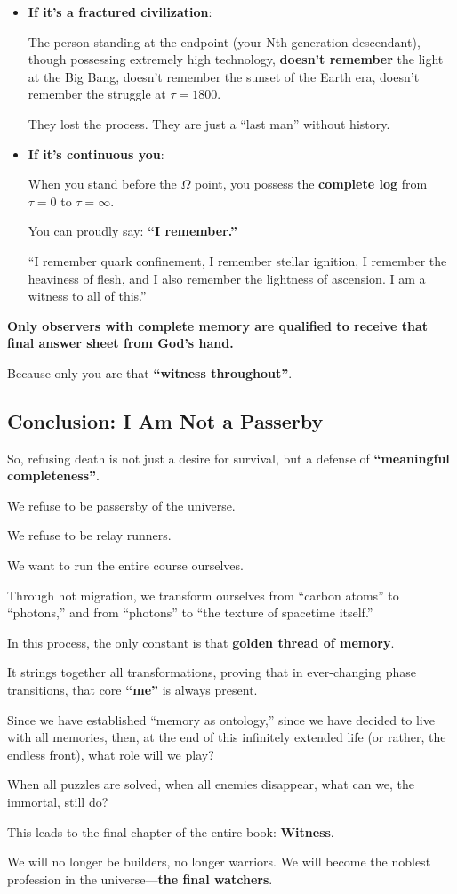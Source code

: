 \begin{itemize}
\item \textbf{If it's a fractured civilization}:

    The person standing at the endpoint (your Nth generation descendant), though possessing extremely high technology, \textbf{doesn't remember} the light at the Big Bang, doesn't remember the sunset of the Earth era, doesn't remember the struggle at $\tau=1800$.

    They lost the process. They are just a ``last man'' without history.

\item \textbf{If it's continuous you}:

    When you stand before the $\Omega$ point, you possess the \textbf{complete log} from $\tau=0$ to $\tau=\infty$.

    You can proudly say: \textbf{``I remember.''}

    ``I remember quark confinement, I remember stellar ignition, I remember the heaviness of flesh, and I also remember the lightness of ascension. I am a witness to all of this.''
\end{itemize}

\textbf{Only observers with complete memory are qualified to receive that final answer sheet from God's hand.}

Because only you are that \textbf{``witness throughout''}.

\subsection{Conclusion: I Am Not a Passerby}

So, refusing death is not just a desire for survival, but a defense of \textbf{``meaningful completeness''}.

We refuse to be passersby of the universe.

We refuse to be relay runners.

We want to run the entire course ourselves.

Through hot migration, we transform ourselves from ``carbon atoms'' to ``photons,'' and from ``photons'' to ``the texture of spacetime itself.''

In this process, the only constant is that \textbf{golden thread of memory}.

It strings together all transformations, proving that in ever-changing phase transitions, that core \textbf{``me''} is always present.

Since we have established ``memory as ontology,'' since we have decided to live with all memories, then, at the end of this infinitely extended life (or rather, the endless front), what role will we play?

When all puzzles are solved, when all enemies disappear, what can we, the immortal, still do?

This leads to the final chapter of the entire book: \textbf{Witness}.

We will no longer be builders, no longer warriors. We will become the noblest profession in the universe---\textbf{the final watchers}.

